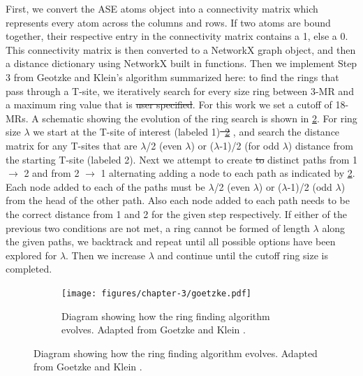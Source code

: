 \documentclass[preprint,numrefs,noinfo,sort&compress]{elsarticle}
\providecommand{\DIFadd}[1]{{\protect\color{blue}\uwave{#1}}} %
\providecommand{\DIFdel}[1]{{\protect\color{red}\sout{#1}}}                      %
\providecommand{\DIFaddbegin}{} %
\providecommand{\DIFaddend}{} %
\providecommand{\DIFdelbegin}{} %
\providecommand{\DIFdelend}{} %
\providecommand{\DIFaddbeginFL}{} %
\providecommand{\DIFaddendFL}{} %
\providecommand{\DIFdelbeginFL}{} %
\providecommand{\DIFdelendFL}{} %
\newcommand{\DIFscaledelfig}{0.5}
\newlength{\DIFdelgraphicswidth} %
\newlength{\DIFdelgraphicsheight} %
\newcommand{\DIFaddincludegraphics}[2][]{{\color{blue}\fbox{\DIFOincludegraphics[#1]{#2}}}} %
\newcommand{\DIFdelincludegraphics}[2][]{%
\sbox{\DIFdelgraphicsbox}{\DIFOincludegraphics[#1]{#2}}%
\settoboxwidth{\DIFdelgraphicswidth}{\DIFdelgraphicsbox} %
\settoboxtotalheight{\DIFdelgraphicsheight}{\DIFdelgraphicsbox} %
\scalebox{\DIFscaledelfig}{%
\parbox[b]{\DIFdelgraphicswidth}{\usebox{\DIFdelgraphicsbox}\\[-\baselineskip] \rule{\DIFdelgraphicswidth}{0em}}\llap{\resizebox{\DIFdelgraphicswidth}{\DIFdelgraphicsheight}{%
\setlength{\unitlength}{\DIFdelgraphicswidth}%
\begin{picture}(1,1)%
\thicklines\linethickness{2pt} %
{\color[rgb]{1,0,0}\put(0,0){\framebox(1,1){}}}%
{\color[rgb]{1,0,0}\put(0,0){\line( 1,1){1}}}%
{\color[rgb]{1,0,0}\put(0,1){\line(1,-1){1}}}%
\end{picture}%
}\hspace*{3pt}}} %
} %
\DeclareRobustCommand{\DIFaddbegin}{\DIFOaddbegin \let\includegraphics\DIFaddincludegraphics} %
\DeclareRobustCommand{\DIFaddend}{\DIFOaddend \let\includegraphics\DIFOincludegraphics} %
\DeclareRobustCommand{\DIFdelbegin}{\DIFOdelbegin \let\includegraphics\DIFdelincludegraphics} %
\DeclareRobustCommand{\DIFdelend}{\DIFOaddend \let\includegraphics\DIFOincludegraphics} %
\DeclareRobustCommand{\DIFaddbeginFL}{\DIFOaddbeginFL \let\includegraphics\DIFaddincludegraphics} %
\DeclareRobustCommand{\DIFaddendFL}{\DIFOaddendFL \let\includegraphics\DIFOincludegraphics} %
\DeclareRobustCommand{\DIFdelbeginFL}{\DIFOdelbeginFL \let\includegraphics\DIFdelincludegraphics} %
\DeclareRobustCommand{\DIFdelendFL}{\DIFOaddendFL \let\includegraphics\DIFOincludegraphics} %
\begin{document}
First, we convert the ASE atoms object into a connectivity matrix which represents every atom across the columns and rows. If two atoms are bound together, their respective entry in the connectivity matrix contains a 1, else a 0. This connectivity matrix is then converted to a NetworkX graph object, and then a distance dictionary using NetworkX built in functions. Then we implement Step 3 from Geotzke and Klein's algorithm \cite{goetzke-properties-1991} summarized here: to find the rings that pass through a T-site, we iteratively search for every size ring between 3-MR and a maximum ring value that is \DIFdelbegin \DIFdel{user specified}\DIFdelend \DIFaddbegin \DIFadd{user-specified}\DIFaddend . For this work we set a cutoff of 18-MRs. A schematic showing the evolution of the ring search is shown in \cref{fig:goetzke}. For ring size \(\lambda\) we start at the T-site of interest (labeled 1)\DIFdelbegin \DIFdel{\mbox{%
\cref{fig:goetzke}}\hskip0pt%
}\DIFdelend , and search the distance matrix for any T-sites that are \(\lambda\)/2 (even \(\lambda\)) or (\(\lambda\)-1)/2 (for odd \(\lambda\)) distance from the starting T-site (labeled 2). Next we attempt to create \DIFdelbegin \DIFdel{to }\DIFdelend \DIFaddbegin \DIFadd{two }\DIFaddend distinct paths from 1 \(\rightarrow\) 2 and from 2 \(\rightarrow\) 1 alternating adding a node to each path as indicated by \cref{fig:goetzke}. Each node added to each of the paths must be \(\lambda\)/2 (even \(\lambda\)) or (\(\lambda\)-1)/2 (odd \(\lambda\)) from the head of the other path. Also each node added to each path needs to be the correct distance from 1 and 2 for the given step respectively. If either of the previous two conditions are not met, a ring cannot be formed of length \(\lambda\) along the given paths, we backtrack and repeat until all possible options have been explored for \(\lambda\). Then we increase \(\lambda\) and continue until the cutoff ring size is completed.

\begin{figure}
\begin{figure}[H]
\centering
\DIFdelbeginFL %
\DIFdelendFL \DIFaddbeginFL \texttt{[image: figures/chapter-3/goetzke.pdf]}
\DIFaddendFL \caption{Diagram showing how the ring finding algorithm evolves. Adapted from Goetzke and Klein \cite{goetzke-properties-1991}. \label{fig:goetzke}}
\end{figure}
\end{figure}
\end{document}
